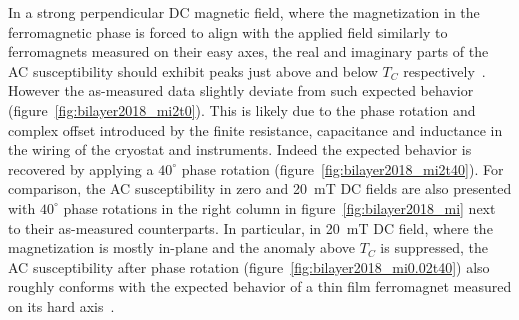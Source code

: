 In a strong perpendicular DC magnetic field, where the magnetization in the ferromagnetic phase is forced to align with the applied field similarly to ferromagnets measured on their easy axes, the real and imaginary parts of the AC susceptibility should exhibit peaks just above and below $T_C$ respectively~\cite{ac_nitroxide, Venus2004}. However the as-measured data slightly deviate from such expected behavior (figure~\ref{fig:bilayer2018_mi2t0}). This is likely due to the phase rotation and complex offset introduced by the finite resistance, capacitance and inductance in the wiring of the cryostat and instruments. Indeed the expected behavior is recovered by applying a $40^{\circ}$ phase rotation (figure~\ref{fig:bilayer2018_mi2t40}). For comparison, the AC susceptibility in zero and 20~mT DC fields are also presented with $40^{\circ}$ phase rotations in the right column in figure~\ref{fig:bilayer2018_mi} next to their as-measured counterparts. In particular, in 20~mT DC field, where the magnetization is mostly in-plane and the anomaly above $T_C$ is suppressed, the AC susceptibility after phase rotation (figure~\ref{fig:bilayer2018_mi0.02t40}) also roughly conforms with the expected behavior of a thin film ferromagnet measured on its hard axis~\cite{Jensen2003}.


